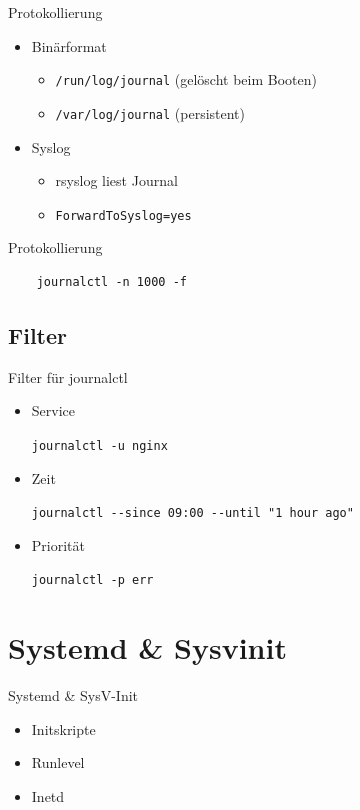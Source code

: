 \begin{frame}[fragile]{Protokollierung}
\begin{itemize}
\item Binärformat
\begin{itemize}
\item \verb|/run/log/journal| (gelöscht beim Booten)
\item \verb|/var/log/journal| (persistent)
\end{itemize}
\item Syslog
	\begin{itemize}
	\item rsyslog liest Journal
	\item \verb|ForwardToSyslog=yes|
	\end{itemize}
\end{itemize}
\end{frame}

\begin{frame}[fragile]{Protokollierung}
  \begin{lstlisting}
    journalctl -n 1000 -f
    \end{lstlisting}
\end{frame}
  
\subsection{Filter}

\begin{frame}[fragile]{Filter für journalctl}
  \begin{itemize}
  \item Service

	  \verb|journalctl -u nginx|
  \item Zeit

	  \verb|journalctl --since 09:00 --until "1 hour ago"|
  \item Priorität

	  \verb|journalctl -p err|
  \end{itemize}
\end{frame}

\section{Systemd \& Sysvinit}

\begin{frame}{Systemd \& SysV-Init}
  \begin{itemize}
  \item Initskripte
  \item Runlevel
  \item Inetd
  \end{itemize}
\end{frame}

